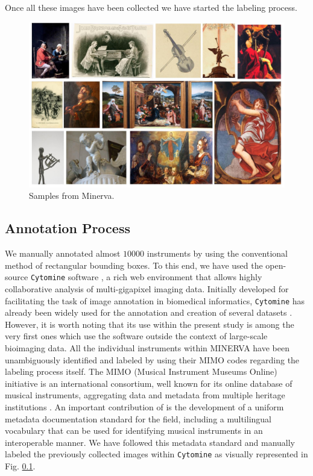 Once all these images have been collected we have started the labeling process.


\begin{figure}[ht!]
\centering
  \includegraphics[width=\linewidth]{./Images/Chapter05/minerva}
  \caption{Samples from Minerva.}
  \label{fig:minerva_dataset}
\end{figure}

\subsection{Annotation Process}

We manually annotated almost $10000$ instruments by using the conventional method of rectangular bounding boxes. To this end, we have used the open-source \texttt{Cytomine} software \cite{maree2016collaborative}, a rich web environment that allows highly collaborative analysis of multi-gigapixel imaging data. Initially developed for facilitating the task of image annotation in biomedical informatics, \texttt{Cytomine} has already been widely used for the annotation and creation of several datasets \cite{mormont2018comparison}. However, it is worth noting that its use within the present study is among the very first ones which use the software outside the context of large-scale bioimaging data. All the individual instruments within MINERVA have been unambiguously identified and labeled by using their MIMO codes regarding the labeling process itself. The MIMO (Musical Instrument Museums Online) initiative is an international consortium, well known for its online database of musical instruments, aggregating data and metadata from multiple heritage institutions \cite{dolan2017mimo}. An important contribution of \citet{dolan2017mimo} is the development of a uniform metadata documentation standard for the field, including a multilingual vocabulary that can be used for identifying musical instruments in an interoperable manner. We have followed this metadata standard and manually labeled the previously collected images within \texttt{Cytomine} as visually represented in Fig. \ref{}.

